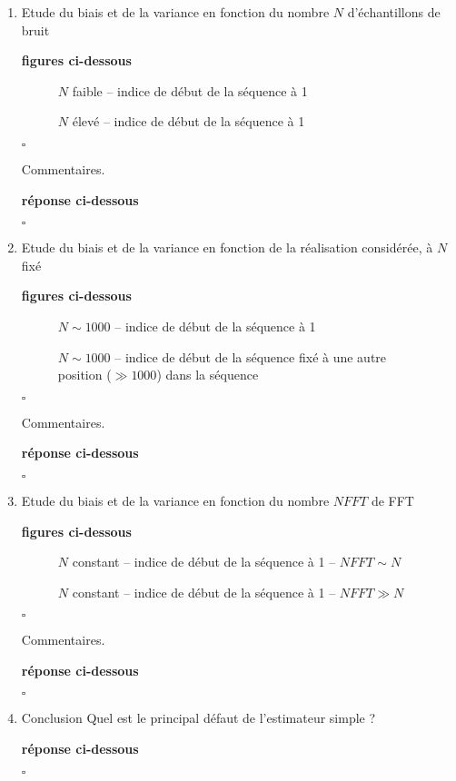 \documentclass{article}
\newcommand{\debutrep}[1]{\color{blue}\begin{center} \hrulefill \textbf{ #1 } \hrulefill \end{center} }
\newcommand{\finrep}{\vspace*{5mm}\hfill $\square$\color{black}\vspace*{5mm}}
\begin{document}
\begin{enumerate}
\renewcommand{\theenumi}{\Alph{enumi}}
\item Etude du biais et de la variance en fonction du nombre $N$ d'échantillons de bruit

\debutrep{figures ci-dessous}

\begin{figure}[h]

\caption{$N$ faible -- indice de début de la séquence à 1}
\end{figure}

\begin{figure}[h]

\caption{$N$ élevé -- indice de début de la séquence à 1}
\end{figure}
\finrep

Commentaires.

\debutrep{réponse ci-dessous}

\finrep

\item Etude du biais et de la variance en fonction de la réalisation considérée, à $N$ fixé

\debutrep{figures ci-dessous}

\begin{figure}[h]

\caption{$N \sim 1000$ -- indice de début de la séquence à 1}
\end{figure}

\begin{figure}[h]

\caption{$N \sim 1000$  -- indice de début de la séquence fixé à une autre position ($\gg 1000$) dans la séquence}
\end{figure}
\finrep

Commentaires.

\debutrep{réponse ci-dessous}

\finrep

\item Etude du biais et de la variance en fonction du nombre $NFFT$ de FFT

\debutrep{figures ci-dessous}

\begin{figure}[h]

\caption{$N$ constant -- indice de début de la séquence à 1 -- $NFFT \sim N$}
\end{figure}

\begin{figure}[h]

\caption{$N$ constant -- indice de début de la séquence à 1 -- $NFFT \gg N$}
\end{figure}

\finrep

Commentaires.

\debutrep{réponse ci-dessous}

\finrep

\item Conclusion
Quel est le principal défaut de l'estimateur simple ?

\debutrep{réponse ci-dessous}

\finrep

\end{enumerate}
\end{document}
